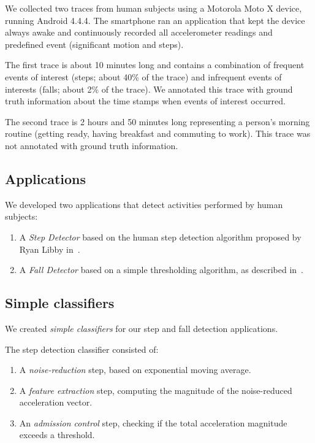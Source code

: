 We collected two traces from human subjects using a Motorola Moto X device, running Android 4.4.4.
The smartphone ran an application that kept the device always awake and 
continuously recorded all accelerometer readings and predefined event 
(significant motion and steps).

The first trace is about 10 minutes long and contains a combination of frequent events of interest
(steps; about 40\% of the trace) and infrequent events of interests (falls; about 2\% of the trace). 
We annotated this trace with ground truth information about the time stamps when events of interest
occurred.

The second trace is 2 hours and 50 minutes long representing a person's morning routine 
(getting ready, having breakfast and commuting to work). This trace was not annotated with ground truth
information.

\subsection{Applications}
\label{sec:applications}

We developed two applications that detect activities performed by 
human subjects:

\begin{enumerate}
\setlength{\itemsep}{-3pt}  

\item A {\em Step Detector} based on the human step detection algorithm
  proposed by Ryan Libby in~\cite{libbyFootstepDetection}.

\item A {\em Fall Detector} based on a simple thresholding algorithm, as
  described in~\cite{kangasFallDetection}.

\end{enumerate}


\subsection{Simple classifiers}
\label{sec:classifiers}

We created {\em simple classifiers} for our step and fall
detection applications. 

\vspace{3 mm}
The step detection classifier consisted of:

\begin{enumerate}
\setlength{\itemsep}{-3pt}  

\item A {\em noise-reduction} step, based on exponential moving average.

\item A {\em feature extraction} step, computing the magnitude of the noise-reduced
  acceleration vector.
  
\item An {\em admission control} step, checking if the total acceleration magnitude
  exceeds a threshold.

\end{enumerate}

